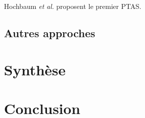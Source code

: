 \documentclass[a4paper,12pt]{report}
\theoremstyle{plain}				%
\theoremstyle{definition}				%
\begin{document}
\bigskip
Hochbaum \textit{et al.} \cite{hochbaum1987using} proposent le premier PTAS.




\subsection{Autres approches}

\section{Synthèse}

\section{Conclusion}









\medskip


\end{document}
